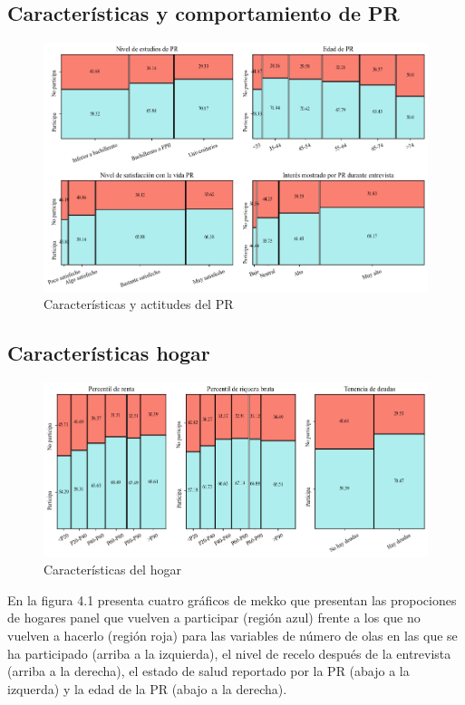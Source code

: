 \subsection*{Características y comportamiento de PR}

\begin{figure}[h]
	\centering
	\includegraphics[width=1\textwidth]{figs/figure2.png}
	\caption{Características y actitudes del PR}
	\label{fig:fig2}
\end{figure}

\subsection*{Características hogar}

\begin{figure}[h]
	\centering
	\includegraphics[width=1\textwidth]{figs/figure3.png}
	\caption{Características del hogar}
	\label{fig:fig3}
\end{figure}

En la figura 4.1 presenta cuatro gráficos de mekko que presentan las propociones de hogares panel que vuelven a participar (región azul) frente a los que no vuelven a hacerlo (región roja) para las variables de número de olas en las que se ha participado (arriba a la izquierda), el nivel de recelo después de la entrevista (arriba a la derecha), el estado de salud reportado por la PR (abajo a la izquerda) y la edad de la PR (abajo a la derecha).


